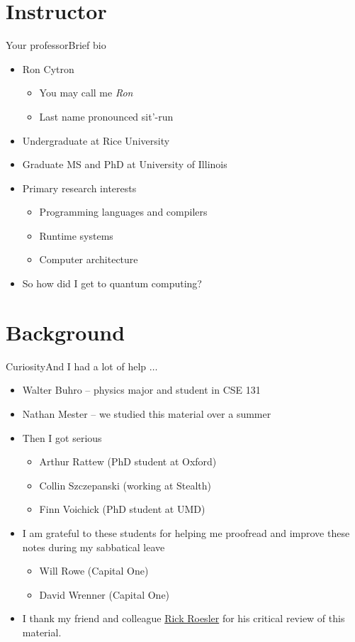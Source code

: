 \section{Instructor}
\begin{frame}{Your professor}{Brief bio}
\begin{itemize}
    \item Ron Cytron
    \begin{itemize}
        \item You may call me \emph{Ron}
        \item Last name pronounced sit'-run
    \end{itemize}
    \item Undergraduate at Rice University
    \item Graduate MS and PhD at University of Illinois
    \item Primary research interests
    \begin{itemize}
        \item Programming languages and compilers
        \item Runtime systems
        \item Computer architecture
    \end{itemize}
    \item So how did I get to quantum computing?
\end{itemize}
    
\end{frame}

\section{Background}
\begin{frame}{Curiosity}{And I had a lot of help $\ldots$}
\begin{itemize}
    \item Walter Buhro -- physics major and student in CSE 131
    \item Nathan Mester -- we studied this material over a summer
    \item Then I got serious
    \begin{itemize}
        \item Arthur Rattew (PhD student at Oxford)
        \item Collin Szczepanski (working at Stealth)
        \item Finn Voichick (PhD student at UMD)
    \end{itemize}
    \item I am grateful to these students for helping me proofread and improve these notes during my sabbatical leave
    \begin{itemize}
        \item Will Rowe (Capital One)
        \item David Wrenner (Capital One)
    \end{itemize}
    \item I thank my friend and colleague \href{https://www.linkedin.com/in/rickroesler/}{Rick Roesler} for his critical review of this material.
\end{itemize}
    
\end{frame}

